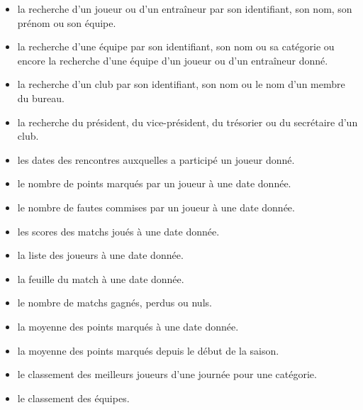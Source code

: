 \documentclass{article}
\begin{document}
\begin{itemize}

\item la recherche d'un joueur ou d'un entraîneur par son identifiant, son nom, son prénom ou son équipe. \\

\item la recherche d'une équipe par son identifiant, son nom ou sa catégorie ou encore la recherche d'une équipe d'un joueur ou d'un entraîneur donné. \\

\item la recherche d'un club par son identifiant, son nom ou le nom d'un membre du bureau. \\

\item la recherche du président, du vice-président, du trésorier ou du secrétaire d'un club. \\

\item les dates des rencontres auxquelles a participé un joueur donné. \\

\item le nombre de points marqués par un joueur à une date donnée. \\

\item le nombre de fautes commises par un joueur à une date donnée. \\

\item les scores des matchs joués à une date donnée. \\

\item la liste des joueurs à une date donnée. \\

\item la feuille du match à une date donnée. \\

\item le nombre de matchs gagnés, perdus ou nuls. \\

\item la moyenne des points marqués à une date donnée. \\

\item la moyenne des points marqués depuis le début de la saison. \\

\item le classement des meilleurs joueurs d’une journée pour une catégorie. \\

\item le classement des équipes. \\


\end{itemize}
\end{document}
